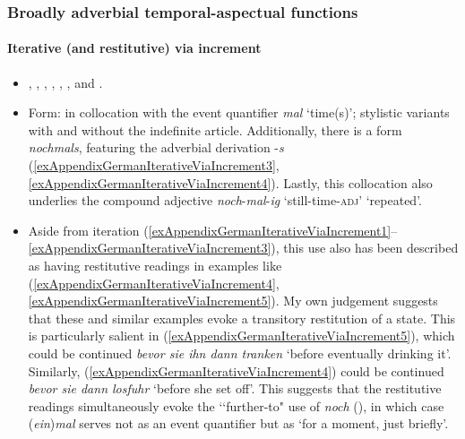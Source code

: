 \subsubsection{Broadly adverbial temporal-aspectual functions}

\paragraph{Iterative (and restitutive) via increment}
\label{appendixGermanIterativeViaIncrement}
\begin{itemize}
	\item 
	\textcite[s.v. \textit{noch einmal}, \textit{nochmal}, \textit{nochmals}]{Duden},
	\textcite[s.v. \textit{nochmals}]{DWDS}, \textcite[176]{KoenigEtAl1993}, \textcite[627]{MetrichFaucher2009}, \textcite[27, 105]{Nederstigt2003}, \textcite{Umbach2012}, \textcite{Sauerland2009} and \textcite{Shetter1966}.
	\item Form: in collocation with the event quantifier \textit{mal} \lq time(s)\rq{}; stylistic variants with and without the indefinite article. Additionally, there is a form \textit{nochmals}, featuring the adverbial derivation \mbox{-\textit{s}} (\ref{exAppendixGermanIterativeViaIncrement3}, \ref{exAppendixGermanIterativeViaIncrement4}).	 Lastly, this collocation also underlies the compound adjective \textit{noch}-\textit{mal}-\textit{ig} \lq still-time-\textsc{adj}' \lq repeated'.
		\item Aside from iteration (\ref{exAppendixGermanIterativeViaIncrement1}– \ref{exAppendixGermanIterativeViaIncrement3}), this use also has been described as having restitutive readings in examples like (\ref{exAppendixGermanIterativeViaIncrement4}, \ref{exAppendixGermanIterativeViaIncrement5}). 	My own judgement suggests that these and similar examples evoke a transitory restitution of a state. This is particularly salient in (\ref{exAppendixGermanIterativeViaIncrement5}), which could be continued \textit{bevor sie ihn dann tranken} \lq before eventually drinking it'. Similarly, (\ref{exAppendixGermanIterativeViaIncrement4}) could be continued  \textit{bevor sie dann losfuhr} \lq before she set off'. This suggests that the restitutive readings simultaneously evoke the \lq\lq further-to" use of \textit{noch} (), in which case (\textit{ein})\textit{mal} serves not as an event quantifier but as \lq for a moment, just briefly'.
\end{itemize}

